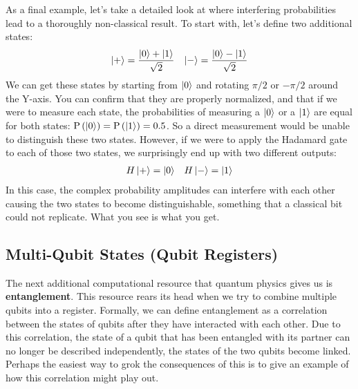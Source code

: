 As a final example, let's take a detailed look at where interfering probabilities lead to a thoroughly
non-classical result. To start with, let's define two additional states:
\begin{align}
  \ket{+} = \frac{\ket{0} + \ket{1}}{\sqrt{2}} && \ket{-} = \frac{\ket{0} - \ket{1}}{\sqrt{2}}
\end{align}
We can get these states by starting from $\ket{0}$ and rotating $\pi/2$ or $-\pi/2$ around the Y-axis. You can
confirm that they are properly normalized, and that if we were to measure each state, the
probabilities of measuring a $\ket{0}$ or a $\ket{1}$ are equal for both states: $\mathrm{P}\left(\ket{0}\right) =
\mathrm{P}\left(\ket{1}\right) = 0.5$. So a direct measurement would be unable to distinguish these two states.
However, if we were to apply the Hadamard gate to each of those two states, we surprisingly end up with two
different outputs:
\begin{align}
  H\ket{+} = \ket{0} && H\ket{-} = \ket{1}
\end{align}
In this case, the complex probability amplitudes can interfere with each other causing the two states to
become distinguishable, something that a classical bit could not replicate. What you see is what you get.

\subsection{Multi-Qubit States (Qubit Registers)}
The next additional computational resource that quantum physics gives us is \textbf{entanglement}. This
resource rears its head when we try to combine multiple qubits into a register. Formally,
we can define entanglement as a correlation between the states of qubits after they have interacted
with each other. Due to this correlation, the state of a qubit that has been entangled with its partner
can no longer be described independently, the states of the two qubits become linked. Perhaps the easiest
way to grok the consequences of this is to give an example of how this correlation might play out.

